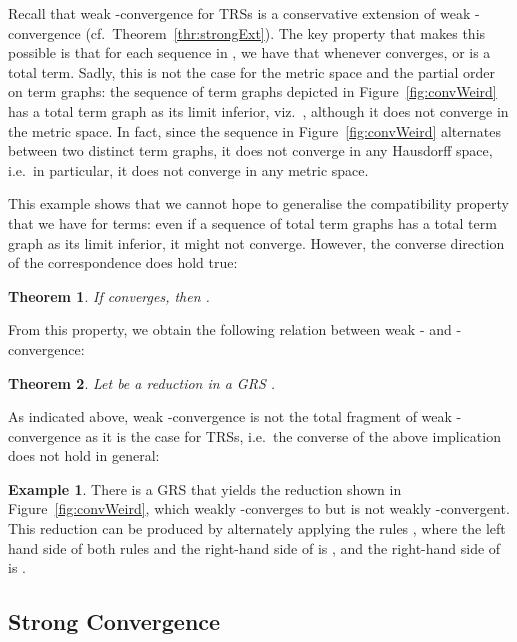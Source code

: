 \documentclass[copyright,creativecommons,UKenglish,final]{eptcs}
\theoremstyle{definition}
\newtheorem{example}{Example}[section]
\theoremstyle{plain}
\newtheorem{theorem}{Theorem}[section]
\begin{document}
Recall that weak -convergence for TRSs is a conservative
extension of weak -convergence (cf.\
Theorem~\ref{thr:strongExt}). The key property that makes this
possible is that for each sequence  in
, we have that  whenever
 converges, or  is a total term. Sadly, this is not the case for the metric
space and the partial order on term graphs: the sequence of term
graphs depicted in Figure~\ref{fig:convWeird} has a total term graph
as its limit inferior, viz.\ , although it does not converge
in the metric space. In fact, since the sequence in
Figure~\ref{fig:convWeird} alternates between two distinct term
graphs, it does not converge in any Hausdorff space, i.e.\ in
particular, it does not converge in any metric space.

This example shows that we cannot hope to generalise the compatibility
property that we have for terms: even if a sequence of total term
graphs has a total term graph as its limit inferior, it might not
converge. However, the converse direction of the correspondence does
hold true:
\begin{theorem}
  \label{thr:limLiminf}
  If  converges, then
  .
\end{theorem}

From this property, we obtain the following relation between weak
- and -convergence:
\begin{theorem}
  Let  be a reduction in a GRS .
  
\end{theorem}
As indicated above, weak -convergence is not the total fragment
of weak -convergence as it is the case for TRSs, i.e.\ the
converse of the above implication does not hold in general:
\begin{example}
  \label{ex:rulesWeird}
  There is a GRS that yields the reduction shown in
  Figure~\ref{fig:convWeird}, which weakly -converges to
   but is not weakly -convergent. This reduction can
  be produced by alternately applying the rules , where
  the left hand side of both rules and the right-hand side of 
  is , and the right-hand side of  is .
\end{example}


\subsection{Strong Convergence}
\label{sec:strong-convergence}
\end{document}
